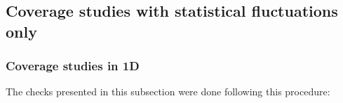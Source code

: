 



\clearpage
\subsection{Coverage studies with statistical fluctuations only}
\label{app:cov:statonly}

\subsubsection{Coverage studies in 1D}
\label{app:cov:statonly:1d}

The checks presented in this subsection were done following this procedure: 

